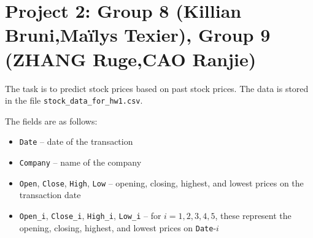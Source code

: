 \documentclass{article}
\begin{document}




\section*{Project 2: Group 8 (Killian Bruni,Maïlys Texier), Group 9 (ZHANG Ruge,CAO Ranjie) }
The task is to predict stock prices based on past stock prices. The data is stored in the file \lstinline$stock_data_for_hw1.csv$.

The fields are as follows: \begin{itemize} \item \lstinline$Date$ -- date of the transaction \item \lstinline$Company$ -- name of the company \item \lstinline$Open$, \lstinline$Close$, \lstinline$High$, \lstinline$Low$ -- opening, closing, highest, and lowest prices on the transaction date \item \lstinline$Open_i$, \lstinline$Close_i$, \lstinline$High_i$, \lstinline$Low_i$ -- for $i=1,2,3,4,5$, these represent the opening, closing, highest, and lowest prices on \lstinline$Date$-$i$ \end{itemize}
\end{document}
